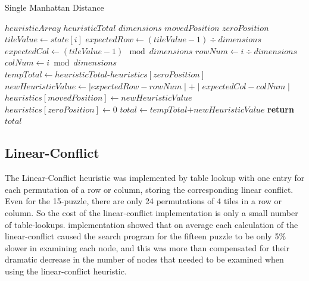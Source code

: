 \documentclass[final]{cmpreport}
\begin{document}
\begin{algorithm}
	\caption{Single Manhattan Distance}\label{Manhattan Distance2}
	\begin{algorithmic}[1]
		\State $heuristicArray$ 
		\State $heuristicTotal$ 
		\State$dimensions$ 
		\State $movedPosition$ 
		\State $zeroPosition$ 
			
		\State $tileValue\gets state[i]$
		\State $expectedRow\gets (tileValue -1)\div dimensions$
		\State $expectedCol\gets (tileValue -1)\mod dimensions$
		\State $rowNum \gets i\div dimensions$
		\State $colNum\gets i \bmod dimensions$
		\State $tempTotal \gets heuristicTotal \texttt{-} heuristics[zeroPosition]$ 
		\State $newHeuristicValue\gets \mid{expectedRow-rowNum}\mid\texttt{+}\mid{expectedCol-colNum}\mid$
		\State $heuristics[movedPosition]\gets newHeuristicValue$
		\State $heuristics[zeroPosition]\gets 0$
		\State $total \gets tempTotal\texttt{+}newHeuristicValue$
		\State \textbf{return} $total$
		\EndProcedure
	\end{algorithmic}
\end{algorithm}



\subsection{Linear-Conflict}
The Linear-Conflict heuristic was implemented by table lookup with one entry for each permutation of a row or column, storing the corresponding linear conflict. Even for the 15-puzzle, there are only 24 permutations of 4 tiles in a row or column. So the cost of the linear-conflict implementation is only a small number of table-lookups. \cite{hansson1992criticizing} implementation showed that on average each calculation of the linear-conflict caused the search program for the fifteen puzzle to be only 5\% slower in examining each node, and this was more than compensated for their dramatic decrease in the number of nodes that needed to be examined when using the linear-conflict heuristic.
\end{document}
